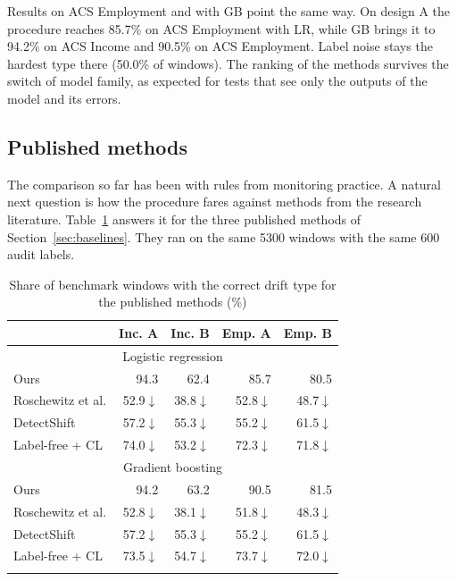 \documentclass[pdflatex,referee,lineno,sn-basic]{sn-jnl}
\begin{document}
Results on ACS Employment and with GB point the same way. On design A the procedure reaches 85.7\% on ACS Employment with LR, while GB brings it to 94.2\% on ACS Income and 90.5\% on ACS Employment. Label noise stays the hardest type there (50.0\% of windows). The ranking of the methods survives the switch of model family, as expected for tests that see only the outputs of the model and its errors.

\subsection{Published methods}\label{sec:res-published}

The comparison so far has been with rules from monitoring practice. A natural next question is how the procedure fares against methods from the research literature. Table~\ref{tab:published} answers it for the three published methods of Section~\ref{sec:baselines}. They ran on the same 5300 windows with the same 600 audit labels.

\begin{table}[!htbp]\centering\tablebodyfont
\caption{Share of benchmark windows with the correct drift type for the published methods (\%)}\label{tab:published}%
\begin{tabular}{@{}lrrrr@{}}
\toprule
 & \multicolumn{1}{c}{Inc. A} & \multicolumn{1}{c}{Inc. B} & \multicolumn{1}{c}{Emp. A} & \multicolumn{1}{c}{Emp. B} \\
\midrule
\multicolumn{5}{c}{Logistic regression} \\
\midrule
Ours & 94.3 & 62.4 & 85.7 & 80.5 \\
Roschewitz et al. & 52.9$\downarrow$ & 38.8$\downarrow$ & 52.8$\downarrow$ & 48.7$\downarrow$ \\
DetectShift & 57.2$\downarrow$ & 55.3$\downarrow$ & 55.2$\downarrow$ & 61.5$\downarrow$ \\
Label-free + CL & 74.0$\downarrow$ & 53.2$\downarrow$ & 72.3$\downarrow$ & 71.8$\downarrow$ \\
\midrule
\multicolumn{5}{c}{Gradient boosting} \\
\midrule
Ours & 94.2 & 63.2 & 90.5 & 81.5 \\
Roschewitz et al. & 52.8$\downarrow$ & 38.1$\downarrow$ & 51.8$\downarrow$ & 48.3$\downarrow$ \\
DetectShift & 57.2$\downarrow$ & 55.3$\downarrow$ & 55.2$\downarrow$ & 61.5$\downarrow$ \\
Label-free + CL & 73.5$\downarrow$ & 54.7$\downarrow$ & 73.7$\downarrow$ & 72.0$\downarrow$ \\
\botrule
\end{tabular}
\end{table}
\end{document}
